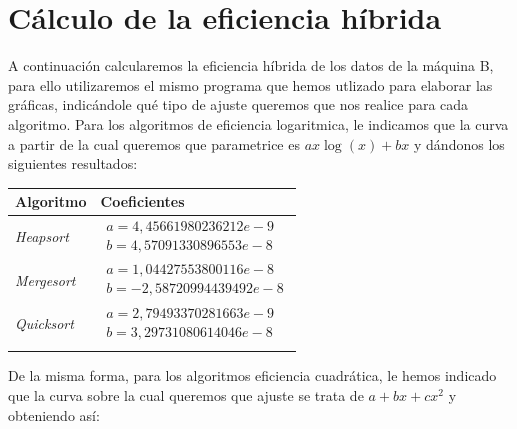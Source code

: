 \documentclass[a4paper, 11pt]{article}
\begin{document}
\section{Cálculo de la eficiencia híbrida}
A continuación calcularemos la eficiencia híbrida de los datos de la máquina B, para ello utilizaremos el mismo programa que hemos utlizado para elaborar las gráficas, indicándole qué tipo de ajuste queremos que nos realice para cada algoritmo. Para los algoritmos de eficiencia logaritmica, le indicamos que la curva a partir de la cual queremos que parametrice es  $ax\log(x)+bx$ y dándonos los siguientes resultados:
\begin{center}
\begin{tabular}{ll}
  Algoritmo & Coeficientes\\ \hline\noalign{\smallskip}
  \textit{Heapsort} & $\begin{array}{ll}
  a = 4,45661980236212e-9\\
b = 4,57091330896553e-8
\end{array}$ \\\hline\noalign{\smallskip}
  \textit{Mergesort} & $\begin{array}{ll}
  a = 1,04427553800116e-8\\
b = -2,58720994439492e-8
\end{array}$\\\hline\noalign{\smallskip}
  \textit{Quicksort} & $\begin{array}{ll}
  a = 2,79493370281663e-9\\
b = 3,29731080614046e-8
\end{array}$\\ \hline\noalign{\smallskip}
  
\end{tabular}
\end{center}
De la misma forma, para los algoritmos eficiencia cuadrática, le hemos indicado que la curva sobre la cual queremos que ajuste se trata de $a+bx+cx^2$ y obteniendo así:
\end{document}

